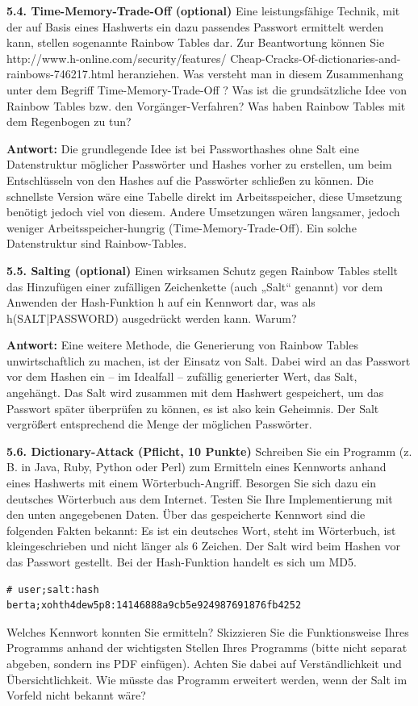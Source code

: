 \documentclass[ngerman]{fbi-aufgabenblatt}
\begin{document}
\textbf{5.4. Time-Memory-Trade-Off (optional)}
Eine leistungsfähige Technik, mit der auf Basis eines Hashwerts ein dazu passendes Passwort ermittelt werden kann, stellen sogenannte Rainbow Tables dar. Zur Beantwortung können Sie http://www.h-online.com/security/features/
Cheap-Cracks-Of-dictionaries-and-rainbows-746217.html heranziehen.
Was versteht man in diesem Zusammenhang unter dem Begriff Time-Memory-Trade-Off ?
Was ist die grundsätzliche Idee von Rainbow Tables bzw. den Vorgänger-Verfahren? Was haben Rainbow Tables mit dem Regenbogen zu tun?

\textbf{Antwort:}
Die grundlegende Idee ist bei Passworthashes ohne Salt eine Datenstruktur möglicher Passwörter und Hashes vorher zu erstellen, um beim Entschlüsseln von den Hashes auf die Passwörter schließen zu können. Die schnellste Version wäre eine Tabelle direkt im Arbeitsspeicher, diese Umsetzung benötigt jedoch viel von diesem. Andere Umsetzungen wären langsamer, jedoch weniger Arbeitsspeicher-hungrig (Time-Memory-Trade-Off). Ein solche Datenstruktur sind Rainbow-Tables.

\textbf{5.5. Salting (optional)}
Einen wirksamen Schutz gegen Rainbow Tables stellt das Hinzufügen einer zufälligen Zeichenkette (auch „Salt“ genannt) vor dem Anwenden der Hash-Funktion h auf ein Kennwort dar, was als h(SALT|PASSWORD) ausgedrückt werden kann. Warum?

\textbf{Antwort:}
Eine weitere Methode, die Generierung von Rainbow Tables unwirtschaftlich zu machen, ist der Einsatz von Salt. Dabei wird an das Passwort vor dem Hashen ein – im Idealfall – zufällig generierter Wert, das Salt, angehängt. Das Salt wird zusammen mit dem Hashwert gespeichert, um das Passwort später überprüfen zu können, es ist also kein Geheimnis. Der Salt vergrößert entsprechend die Menge der möglichen Passwörter.

\textbf{5.6. Dictionary-Attack (Pflicht, 10 Punkte)}
Schreiben Sie ein Programm (z. B. in Java, Ruby, Python oder Perl) zum Ermitteln eines Kennworts anhand eines Hashwerts mit einem Wörterbuch-Angriff. Besorgen Sie sich dazu ein deutsches Wörterbuch aus dem Internet. Testen Sie Ihre Implementierung mit den unten angegebenen Daten. Über das gespeicherte Kennwort sind die folgenden Fakten bekannt: Es ist ein deutsches Wort, steht im Wörterbuch, ist kleingeschrieben und nicht länger als 6 Zeichen. Der Salt wird beim Hashen vor das Passwort gestellt. Bei der Hash-Funktion handelt es sich um MD5. 
\begin{lstlisting}
# user;salt:hash
berta;xohth4dew5p8:14146888a9cb5e924987691876fb4252
\end{lstlisting}
Welches Kennwort konnten Sie ermitteln? Skizzieren Sie die Funktionsweise Ihres Programms anhand der wichtigsten Stellen Ihres Programms (bitte nicht separat abgeben, sondern ins PDF einfügen). Achten Sie dabei auf Verständlichkeit und Übersichtlichkeit.
Wie müsste das Programm erweitert werden, wenn der Salt im Vorfeld nicht bekannt wäre?
\end{document}
